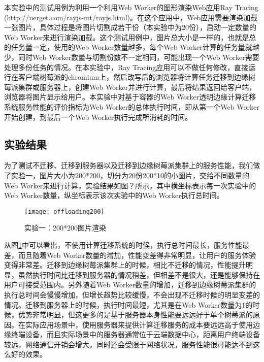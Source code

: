 本实验中的测试用例为利用一个利用Web Worker的图形渲染Web应用Ray Tracing (http://nerget.com/rayjs-mt/rayjs.html)。在这个应用中，Web应用需要渲染加载一张图片，具体过程是将图片切割成若干份（本实验中为20份），启动一定数量的Web Worker来进行渲染加载。这个测试用例中，图片总大小是一样的，也就是总的任务量一定，使用的Web Worker数量越多，每个Web Worker计算的任务量就越少，同时Web Worker数量与切割份数不一定相同，可能出现一个Web Worker需要处理多份任务的情况。在本实验中，Ray Tracing应用可以不做任何修改，直接运行在客户端树莓派的chromium上，然后改写后的浏览器将计算任务迁移到边缘树莓派集群或服务器上，创建Web Worker并进行计算，最后将结果返回给客户端，浏览器将图片显示给用户。本实验中对基于容器的Web Worker透明边缘计算迁移系统服务性能的评价指标为Web Worker的总体执行时间，即从第一个Web Worker开始创建，到最后一个Web Worker执行完成所消耗的时间。

\subsection{实验结果}

为了测试不迁移、迁移到服务器以及迁移到边缘树莓派集群上的服务性能，我们做了实验一，图片大小为200*200，切分为20份200*10的小图片，交给不同数量的Web Worker来进行计算，实验结果如图？所示，其中横坐标表示每一次实验中的Web Worker数量，纵坐标表示该次实验中的Web Worker执行总时间。

\begin{figure}[!htbp]
    \centering
    \texttt{[image: offloading200]}
    \caption{实验一：200*200图片渲染}
    \label{fig:computation_offloading_result_picture_200}
\end{figure}

从图\ref{fig:computation_offloading_result_picture_200}中可以看出，不使用计算迁移系统的时候，执行总时间最长，服务性能最差，而且随着Web Worker数量的增加，性能变差得非常明显，让用户的服务体验变得非常差。迁移到边缘树莓派集群上的时候，相比不迁移的情况，性能提升明显，虽然执行时间比迁移到服务器的情况稍差，但相差不是很大，还是能够保持在用户可接受范围内。另外随着Web Worker数量的增加，迁移到边缘树莓派集群的执行总时间会慢慢增加，但增长趋势比较缓慢，不会出现不迁移时候的明显变差的情况。迁移到服务器上的时候，执行时间最短，尤其是在Web Worker数量为1的时候，优势非常明显，但这更多的是基于服务器本身性能要远远好于单个树莓派的原因。在实际应用场景中，使用服务器来提供计算迁移服务的成本要远远高于使用边缘终端设备，而且实际场景中的服务器通常位于云端数据中心，距离用户终端设备较远，网络通信开销会增大，同时还会受限于网络状况，服务性能很可能达不到这么好的效果。

